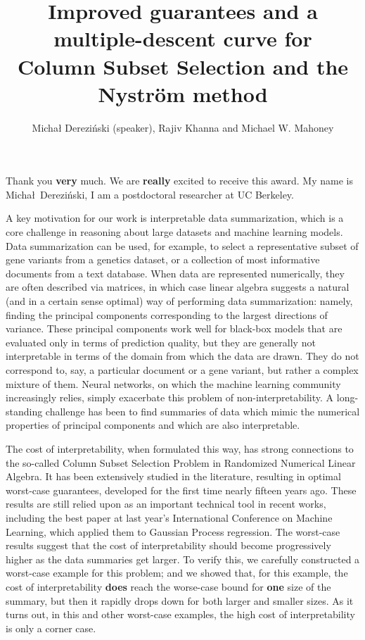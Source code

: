 \documentclass[11pt, oneside]{article}   	%
\title{Improved guarantees and a multiple-descent curve for \\
  Column Subset Selection %
  and the Nystr\"om method}
\author{Micha{\l} Derezi\'nski (speaker), Rajiv Khanna and Michael W. Mahoney}
\date{}							%
\begin{document}
\maketitle
\vspace{-5mm}

Thank you \textbf{very} much. We are \textbf{really} excited to receive this award. My
name is Micha{\l}~Derezi\'nski, I am a postdoctoral researcher at UC Berkeley.

A key motivation for our work is interpretable data summarization,
which is a core challenge in reasoning 
about large datasets and machine learning models.  Data summarization
can be used, for example, to select a representative subset of gene
variants from a genetics dataset, or a collection of most informative
documents from a text database.  When data are represented
numerically, they are often described via matrices, in which case
linear algebra suggests a natural (and in a certain sense optimal) way
of performing data summarization: namely, finding the principal components
corresponding to the largest directions of variance.  These principal
components work well for black-box models that are evaluated only in
terms of prediction quality, but they are generally not interpretable
in terms of the domain from which the data are drawn. They do not
correspond to, say, a particular document or a gene variant, but
rather a complex mixture of them.  Neural networks, on which the
machine learning community increasingly relies, simply exacerbate this
problem of non-interpretability.  A long-standing challenge has been to find summaries of data
which mimic the numerical properties of principal components and which
are also interpretable. 

The cost of interpretability, when formulated this way, has strong
connections to the so-called Column Subset Selection Problem in
Randomized Numerical Linear Algebra. It
has been extensively studied in the literature, resulting in optimal
worst-case guarantees, developed for the first time nearly fifteen
years ago. These results are still relied upon as an important
technical tool in recent works, including the best paper at last
year’s International Conference on Machine Learning, which applied
them to Gaussian Process regression. The worst-case results suggest
that the cost of interpretability should become progressively higher
as the data summaries get larger.
To verify this, we carefully constructed a worst-case example for this problem; and we
showed that, for this example, the cost of interpretability \textbf{does} reach
the worse-case bound for \textbf{one} size of the summary, but then it rapidly
drops down for both larger and smaller sizes. As it turns out, in this and other
worst-case examples, the high cost of interpretability is only a
corner case.
\end{document}
